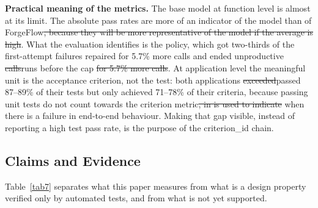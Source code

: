 \documentclass[pdflatex,sn-mathphys-num]{sn-jnl}%
\newcommand{\fix}[1]{{\color{fixcol}#1}}
\newcommand{\fixdel}[1]{{\color{fixcol}\sout{#1}}}
\newcommand{\rw}[2]{{\color{rwcol}#1}}%
\theoremstyle{thmstyleone}%
\theoremstyle{thmstyletwo}%
\theoremstyle{thmstylethree}%
\begin{document}
\rw{\textbf{Practical meaning of the metrics.} The base model at function level is almost at its limit. The absolute pass rates are more of an indicator of the model than of ForgeFlow\fixdel{, because they will be more representative of the model if the average is high}. What the evaluation identifies is the policy, which got two-thirds of the first-attempt \fix{failures repaired for 5.7\% more calls and} ended unproductive \fixdel{calls}\fix{runs} before the cap\fixdel{ for 5.7\% more calls}. At application level the meaningful unit is the acceptance criterion, not the test: both applications \fixdel{exceeded}\fix{passed} 87--89\% of their tests but only achieved 71--78\% of their criteria\fix{, because} passing unit tests do not count towards the criterion metric\fixdel{, in is used to indicate}\fix{ when there is} a failure in end-to-end behaviour. Making that gap visible, instead of reporting a high test pass rate, is the purpose of the criterion\_id chain.}{\textbf{Practical meaning of the metrics.} At function level the base model is near its ceiling, so the absolute pass rates say more about the model than about ForgeFlow; what the evaluation isolates is the policy, which recovered two-thirds of first-attempt failures for 5.7\% more calls and ended every unproductive trajectory before the cap. At application level the meaningful unit is the acceptance criterion, not the test: both applications passed 87--89\% of their tests yet met only 71--78\% of their criteria and were not delivered, because the criterion metric does not let passing unit tests stand in for failing end-to-end behaviour. Making that gap visible, instead of reporting a high test pass rate, is the purpose of the criterion\_id chain.}

\subsection{Claims and Evidence}\label{sec9.2}

Table~\ref{tab7} separates what this paper measures from what is a design property verified only by automated tests, and from what is not yet supported.
\end{document}
